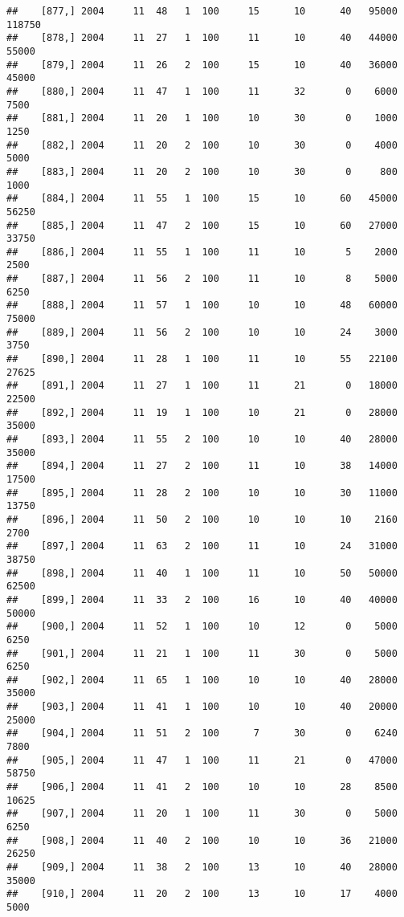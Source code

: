 \documentclass{article}\usepackage[]{graphicx}\usepackage[]{color}
\makeatletter
\newenvironment{kframe}{%
 \def\at@end@of@kframe{}%
 \ifinner\ifhmode%
  \def\at@end@of@kframe{\end{minipage}}%
  \begin{minipage}{\columnwidth}%
 \fi\fi%
 \def\FrameCommand##1{\hskip\@totalleftmargin \hskip-\fboxsep
 \colorbox{shadecolor}{##1}\hskip-\fboxsep
     \hskip-\linewidth \hskip-\@totalleftmargin \hskip\columnwidth}%
 \MakeFramed {\advance\hsize-\width
   \@totalleftmargin\z@ \linewidth\hsize
   \@setminipage}}%
 {\par\unskip\endMakeFramed%
 \at@end@of@kframe}
\newenvironment{knitrout}{}{} %
\makeatother
\begin{document}
\begin{knitrout}
\begin{kframe}
\begin{verbatim}
##    [877,] 2004     11  48   1  100     15      10      40   95000  118750
##    [878,] 2004     11  27   1  100     11      10      40   44000   55000
##    [879,] 2004     11  26   2  100     15      10      40   36000   45000
##    [880,] 2004     11  47   1  100     11      32       0    6000    7500
##    [881,] 2004     11  20   1  100     10      30       0    1000    1250
##    [882,] 2004     11  20   2  100     10      30       0    4000    5000
##    [883,] 2004     11  20   2  100     10      30       0     800    1000
##    [884,] 2004     11  55   1  100     15      10      60   45000   56250
##    [885,] 2004     11  47   2  100     15      10      60   27000   33750
##    [886,] 2004     11  55   1  100     11      10       5    2000    2500
##    [887,] 2004     11  56   2  100     11      10       8    5000    6250
##    [888,] 2004     11  57   1  100     10      10      48   60000   75000
##    [889,] 2004     11  56   2  100     10      10      24    3000    3750
##    [890,] 2004     11  28   1  100     11      10      55   22100   27625
##    [891,] 2004     11  27   1  100     11      21       0   18000   22500
##    [892,] 2004     11  19   1  100     10      21       0   28000   35000
##    [893,] 2004     11  55   2  100     10      10      40   28000   35000
##    [894,] 2004     11  27   2  100     11      10      38   14000   17500
##    [895,] 2004     11  28   2  100     10      10      30   11000   13750
##    [896,] 2004     11  50   2  100     10      10      10    2160    2700
##    [897,] 2004     11  63   2  100     11      10      24   31000   38750
##    [898,] 2004     11  40   1  100     11      10      50   50000   62500
##    [899,] 2004     11  33   2  100     16      10      40   40000   50000
##    [900,] 2004     11  52   1  100     10      12       0    5000    6250
##    [901,] 2004     11  21   1  100     11      30       0    5000    6250
##    [902,] 2004     11  65   1  100     10      10      40   28000   35000
##    [903,] 2004     11  41   1  100     10      10      40   20000   25000
##    [904,] 2004     11  51   2  100      7      30       0    6240    7800
##    [905,] 2004     11  47   1  100     11      21       0   47000   58750
##    [906,] 2004     11  41   2  100     10      10      28    8500   10625
##    [907,] 2004     11  20   1  100     11      30       0    5000    6250
##    [908,] 2004     11  40   2  100     10      10      36   21000   26250
##    [909,] 2004     11  38   2  100     13      10      40   28000   35000
##    [910,] 2004     11  20   2  100     13      10      17    4000    5000

\end{verbatim}
\end{kframe}
\end{knitrout}
\end{document}
